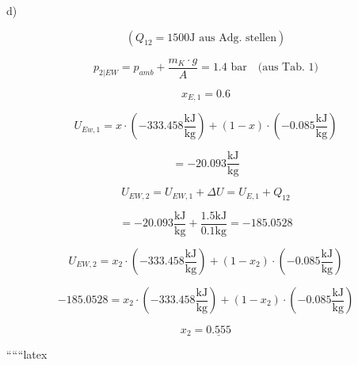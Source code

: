 d)

\[
(Q_{12} = 1500 \text{J aus Adg. stellen})
\]

\[
p_{2|EW} = p_{amb} + \frac{m_{K} \cdot g}{A} = 1.4 \text{ bar} \quad \text{(aus Tab. 1)}
\]

\[
x_{E,1} = 0.6
\]

\[
U_{Ew,1} = x \cdot (-333.458 \frac{\text{kJ}}{\text{kg}}) + (1 - x) \cdot (-0.085 \frac{\text{kJ}}{\text{kg}})
\]

\[
= -20.093 \frac{\text{kJ}}{\text{kg}}
\]

\[
U_{EW,2} = U_{EW,1} + \Delta U = U_{E,1} + Q_{12}
\]

\[
= -20.093 \frac{\text{kJ}}{\text{kg}} + \frac{1.5 \text{kJ}}{0.1 \text{kg}} = -185.0528
\]

\[
U_{EW,2} = x_2 \cdot (-333.458 \frac{\text{kJ}}{\text{kg}}) + (1 - x_2) \cdot (-0.085 \frac{\text{kJ}}{\text{kg}})
\]

\[
-185.0528 = x_2 \cdot (-333.458 \frac{\text{kJ}}{\text{kg}}) + (1 - x_2) \cdot (-0.085 \frac{\text{kJ}}{\text{kg}})
\]

\[
x_2 = \underline{0.555}
\]

``````latex